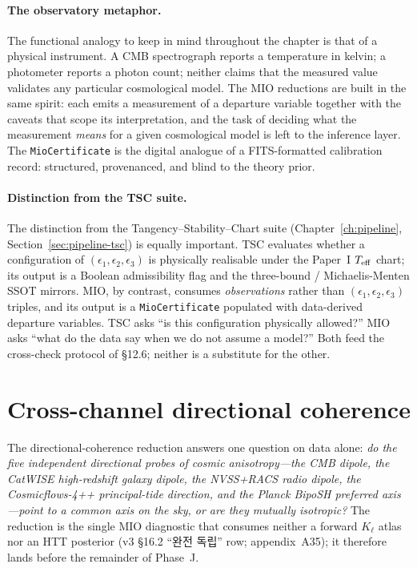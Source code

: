 \paragraph{The observatory metaphor.}

The functional analogy to keep in mind throughout the
chapter is that of a physical instrument.  A CMB
spectrograph reports a temperature in kelvin; a photometer
reports a photon count; neither claims that the measured
value validates any particular cosmological model.  The
MIO reductions are built in the same spirit: each emits a
measurement of a departure variable together with the
caveats that scope its interpretation, and the task of
deciding what the measurement \emph{means} for a given
cosmological model is left to the inference layer.  The
\texttt{MioCertificate} is the digital analogue of a
FITS-formatted calibration record: structured, provenanced,
and blind to the theory prior.

\paragraph{Distinction from the TSC suite.}

The distinction from the Tangency--Stability--Chart suite
(Chapter~\ref{ch:pipeline},
Section~\ref{sec:pipeline-tsc}) is equally important.  TSC
evaluates whether a configuration of
$(\epsilon_1, \epsilon_2, \epsilon_3)$ is physically
realisable under the Paper~I $T_{\rm eff}$ chart; its output
is a Boolean admissibility flag and the three-bound /
Michaelis-Menten SSOT mirrors.  MIO, by contrast, consumes
\emph{observations} rather than
$(\epsilon_1, \epsilon_2, \epsilon_3)$ triples, and its
output is a \texttt{MioCertificate} populated with
data-derived departure variables.  TSC asks ``is this
configuration physically allowed?'' MIO asks ``what do the
data say when we do not assume a model?''  Both feed the
cross-check protocol of §12.6; neither is a substitute for
the other.


\section{Cross-channel directional coherence}
\label{sec:mio-coherence}

The directional-coherence reduction answers one question on
data alone: \emph{do the five independent directional probes
of cosmic anisotropy---the CMB dipole, the CatWISE
high-redshift galaxy dipole, the NVSS+RACS radio dipole, the
Cosmicflows-4++ principal-tide direction, and the Planck
BipoSH preferred axis---point to a common axis on the sky,
or are they mutually isotropic?}  The reduction is the
single MIO diagnostic that consumes neither a forward
$K_\ell$ atlas nor an HTT posterior (v3 §16.2
``완전 독립'' row; appendix~A35); it therefore lands
before the remainder of Phase~J.


